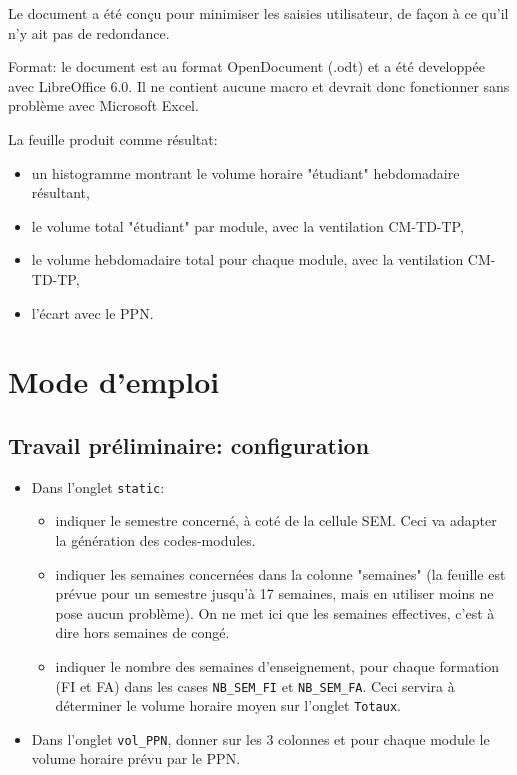 \documentclass[12pt,a4paper]{article}
\begin{document}
Le document a été conçu pour minimiser les saisies utilisateur, de façon à ce qu'il n'y ait pas de redondance.

Format: le document est au format OpenDocument (.odt) et a été developpée avec LibreOffice 6.0.
Il ne contient aucune macro et devrait donc fonctionner sans problème avec Microsoft Excel.

La feuille produit comme résultat:
\begin{itemize}
\item un histogramme montrant le volume horaire "étudiant" hebdomadaire résultant,
\item le volume total "étudiant" par module, avec la ventilation CM-TD-TP,
\item le volume hebdomadaire total pour chaque module, avec la ventilation CM-TD-TP,
\item l'écart avec le PPN.
\end{itemize}



\section{Mode d'emploi}

\subsection{Travail préliminaire: configuration}

\begin{itemize}
\item Dans l'onglet {\tt static}:
\begin{itemize}
\item indiquer le semestre concerné, à coté de la cellule SEM.
Ceci va adapter la génération des codes-modules.
\item indiquer les semaines concernées dans la colonne "semaines" (la feuille est prévue pour un semestre jusqu'à 17 semaines, mais en utiliser moins ne pose aucun problème).
On ne met ici que les semaines effectives, c'est à dire hors semaines de congé.
\item indiquer le  nombre des semaines d'enseignement, pour chaque formation (FI et FA) dans les cases {\tt NB\_SEM\_FI} et {\tt NB\_SEM\_FA}.
Ceci servira à déterminer le volume horaire moyen sur l'onglet {\tt Totaux}.
\end{itemize}


\item Dans l'onglet {\tt vol\_PPN}, donner sur les 3 colonnes et pour chaque module le volume horaire prévu par le PPN.
\end{itemize}
\end{document}
